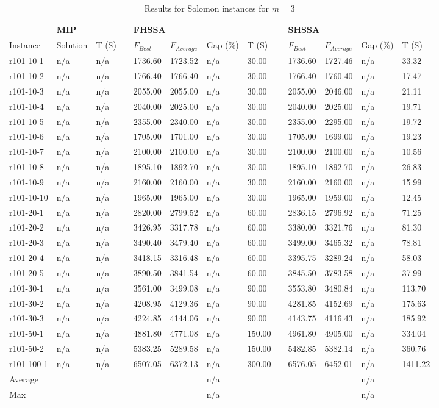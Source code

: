 \documentclass[final,5p,times,twocolumn]{elsarticle}
\begin{document}
{{{{{{{{{{{{{\begin{table*}[htbp]
\caption{Results for Solomon instances for $m=3$}
\centering
\begin{tabularx}{\linewidth}{X l l l l l l l l l l l l}
\hline
& \multicolumn{2}{l}{MIP}&&\multicolumn{4}{l}{FHSSA}&& \multicolumn{4}{l}{SHSSA}\\
\hline
Instance & Solution & T (S) & & $F_{Best}$ & $F_{Average}$  & Gap (\%) & T (S) & & $F_{Best}$ & $F_{Average}$  & Gap (\%) & T (S)\\
\hline
r101-10-1&n/a&n/a&&1736.60&1723.52&n/a&30.00&&1736.60&1727.46&n/a&33.32\\
r101-10-2&n/a&n/a&&1766.40&1766.40&n/a&30.00&&1766.40&1760.40&n/a&17.47\\
r101-10-3&n/a&n/a&&2055.00&2055.00&n/a&30.00&&2055.00&2046.00&n/a&21.11\\
r101-10-4&n/a&n/a&&2040.00&2025.00&n/a&30.00&&2040.00&2025.00&n/a&19.71\\
r101-10-5&n/a&n/a&&2355.00&2340.00&n/a&30.00&&2355.00&2295.00&n/a&19.72\\
r101-10-6&n/a&n/a&&1705.00&1701.00&n/a&30.00&&1705.00&1699.00&n/a&19.23\\
r101-10-7&n/a&n/a&&2100.00&2100.00&n/a&30.00&&2100.00&2100.00&n/a&10.56\\
r101-10-8&n/a&n/a&&1895.10&1892.70&n/a&30.00&&1895.10&1892.70&n/a&26.83\\
r101-10-9&n/a&n/a&&2160.00&2160.00&n/a&30.00&&2160.00&2160.00&n/a&15.99\\
r101-10-10&n/a&n/a&&1965.00&1965.00&n/a&30.00&&1965.00&1959.00&n/a&12.45\\
r101-20-1&n/a&n/a&&2820.00&2799.52&n/a&60.00&&2836.15&2796.92&n/a&71.25\\
r101-20-2&n/a&n/a&&3426.95&3317.78&n/a&60.00&&3380.00&3321.76&n/a&81.30\\
r101-20-3&n/a&n/a&&3490.40&3479.40&n/a&60.00&&3499.00&3465.32&n/a&78.81\\
r101-20-4&n/a&n/a&&3418.15&3316.48&n/a&60.00&&3395.75&3289.24&n/a&58.03\\
r101-20-5&n/a&n/a&&3890.50&3841.54&n/a&60.00&&3845.50&3783.58&n/a&37.99\\
r101-30-1&n/a&n/a&&3561.00&3499.08&n/a&90.00&&3553.80&3480.84&n/a&113.70\\
r101-30-2&n/a&n/a&&4208.95&4129.36&n/a&90.00&&4281.85&4152.69&n/a&175.63\\
r101-30-3&n/a&n/a&&4224.85&4144.06&n/a&90.00&&4143.75&4116.43&n/a&185.92\\
r101-50-1&n/a&n/a&&4881.80&4771.08&n/a&150.00&&4961.80&4905.00&n/a&334.04\\
r101-50-2&n/a&n/a&&5383.25&5289.58&n/a&150.00&&5482.85&5382.14&n/a&360.76\\
r101-100-1&n/a &n/a&&6507.05&6372.13&n/a&300.00&&6576.05&6452.01&n/a&1411.22\\
\hline
Average &&&&&&n/a&&&&&n/a\\
Max &&&&&&n/a&&&&&n/a\\
\hline
\end{tabularx}
\label{tab:bm_3}
\end{table*}


}}}}}}}}}}}}}
\end{document}
